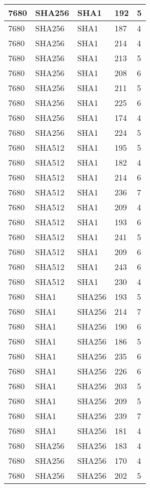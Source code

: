 \begin{tabular}{| l | l | l | l | l |}
7680 & SHA256 & SHA1 & 192 & 5 \\ \hline 
7680 & SHA256 & SHA1 & 187 & 4 \\ \hline 
7680 & SHA256 & SHA1 & 214 & 4 \\ \hline 
7680 & SHA256 & SHA1 & 213 & 5 \\ \hline 
7680 & SHA256 & SHA1 & 208 & 6 \\ \hline 
7680 & SHA256 & SHA1 & 211 & 5 \\ \hline 
7680 & SHA256 & SHA1 & 225 & 6 \\ \hline 
7680 & SHA256 & SHA1 & 174 & 4 \\ \hline 
7680 & SHA256 & SHA1 & 224 & 5 \\ \hline 
7680 & SHA512 & SHA1 & 195 & 5 \\ \hline 
7680 & SHA512 & SHA1 & 182 & 4 \\ \hline 
7680 & SHA512 & SHA1 & 214 & 6 \\ \hline 
7680 & SHA512 & SHA1 & 236 & 7 \\ \hline 
7680 & SHA512 & SHA1 & 209 & 4 \\ \hline 
7680 & SHA512 & SHA1 & 193 & 6 \\ \hline 
7680 & SHA512 & SHA1 & 241 & 5 \\ \hline 
7680 & SHA512 & SHA1 & 209 & 6 \\ \hline 
7680 & SHA512 & SHA1 & 243 & 6 \\ \hline 
7680 & SHA512 & SHA1 & 230 & 4 \\ \hline 
7680 & SHA1 & SHA256 & 193 & 5 \\ \hline 
7680 & SHA1 & SHA256 & 214 & 7 \\ \hline 
7680 & SHA1 & SHA256 & 190 & 6 \\ \hline 
7680 & SHA1 & SHA256 & 186 & 5 \\ \hline 
7680 & SHA1 & SHA256 & 235 & 6 \\ \hline 
7680 & SHA1 & SHA256 & 226 & 6 \\ \hline 
7680 & SHA1 & SHA256 & 203 & 5 \\ \hline 
7680 & SHA1 & SHA256 & 209 & 5 \\ \hline 
7680 & SHA1 & SHA256 & 239 & 7 \\ \hline 
7680 & SHA1 & SHA256 & 181 & 4 \\ \hline 
7680 & SHA256 & SHA256 & 183 & 4 \\ \hline 
7680 & SHA256 & SHA256 & 170 & 4 \\ \hline 
7680 & SHA256 & SHA256 & 202 & 5 \\ \hline 

\end{tabular}
